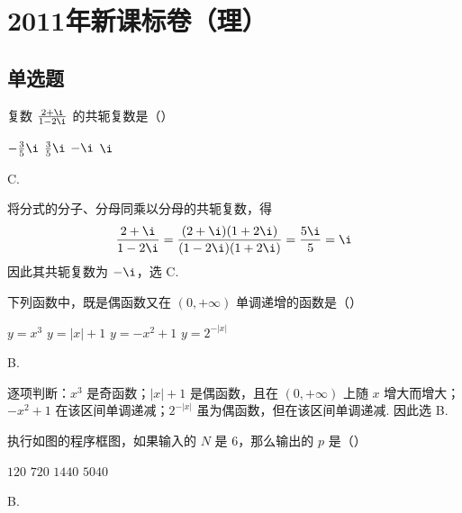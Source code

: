 \chapter{2011年新课标卷（理）}

\section{单选题}

\begin{problem}
复数 \(\frac{2 + \i}{1 - 2\i}\) 的共轭复数是（\quad）

\choices
    {\(-\frac{3}{5}\i\)}
    {\(\frac{3}{5}\i\)}
    {\(-\i\)}
    {\(\i\)}
\end{problem}

\begin{answer}
C.
\end{answer}

\begin{solution}
将分式的分子、分母同乘以分母的共轭复数，得
\[
\frac{2+\i}{1-2\i}=\frac{(2+\i)(1+2\i)}{(1-2\i)(1+2\i)}
=\frac{5\i}{5}=\i
\]
因此其共轭复数为 \(-\i\)，选 C.
\end{solution}

\begin{problem}
下列函数中，既是偶函数又在 \(\left(0, +\infty\right)\) 单调递增的函数是（\quad）

\choices
    {\(y = x^{3}\)}
    {\(y = |x| + 1\)}
    {\(y = -x^{2} + 1\)}
    {\(y = 2^{-|x|}\)}
\end{problem}

\begin{answer}
B.
\end{answer}

\begin{solution}
逐项判断：\(x^{3}\) 是奇函数；\(|x|+1\) 是偶函数，且在 \(\left(0,+\infty\right)\) 上随 \(x\) 增大而增大；\(-x^{2}+1\) 在该区间单调递减；\(2^{-|x|}\) 虽为偶函数，但在该区间单调递减. 因此选 B.
\end{solution}

\begin{problem}
执行如图的程序框图，如果输入的 \(N\) 是 \(6\)，那么输出的 \(p\) 是（\quad）


\choices
    {\(120\)}
    {\(720\)}
    {\(1440\)}
    {\(5040\)}
\end{problem}

\begin{answer}
B.
\end{answer}

